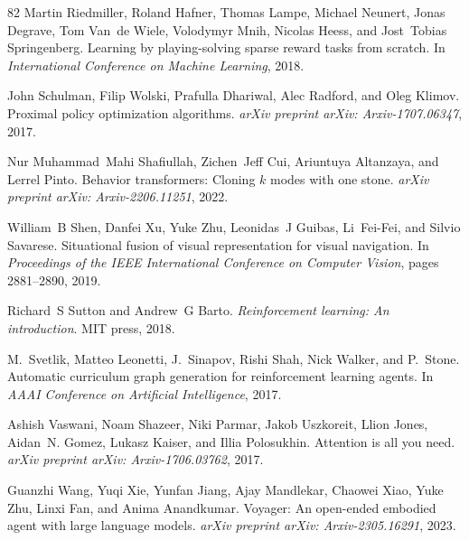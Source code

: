 \documentclass{article}
\begin{document}
\begin{thebibliography}{82}
Martin Riedmiller, Roland Hafner, Thomas Lampe, Michael Neunert, Jonas Degrave, Tom Van~de Wiele, Volodymyr Mnih, Nicolas Heess, and Jost~Tobias Springenberg.
\newblock Learning by playing-solving sparse reward tasks from scratch.
\newblock In \emph{International Conference on Machine Learning}, 2018.

John Schulman, Filip Wolski, Prafulla Dhariwal, Alec Radford, and Oleg Klimov.
\newblock Proximal policy optimization algorithms.
\newblock \emph{arXiv preprint arXiv: Arxiv-1707.06347}, 2017.

Nur Muhammad~Mahi Shafiullah, Zichen~Jeff Cui, Ariuntuya Altanzaya, and Lerrel Pinto.
\newblock Behavior transformers: Cloning $k$ modes with one stone.
\newblock \emph{arXiv preprint arXiv: Arxiv-2206.11251}, 2022.

William~B Shen, Danfei Xu, Yuke Zhu, Leonidas~J Guibas, Li~Fei-Fei, and Silvio Savarese.
\newblock Situational fusion of visual representation for visual navigation.
\newblock In \emph{Proceedings of the IEEE International Conference on Computer Vision}, pages 2881--2890, 2019.

Richard~S Sutton and Andrew~G Barto.
\newblock \emph{Reinforcement learning: An introduction}.
\newblock MIT press, 2018.

M.~Svetlik, Matteo Leonetti, J.~Sinapov, Rishi Shah, Nick Walker, and P.~Stone.
\newblock Automatic curriculum graph generation for reinforcement learning agents.
\newblock In \emph{AAAI Conference on Artificial Intelligence}, 2017.

Ashish Vaswani, Noam Shazeer, Niki Parmar, Jakob Uszkoreit, Llion Jones, Aidan~N. Gomez, Lukasz Kaiser, and Illia Polosukhin.
\newblock Attention is all you need.
\newblock \emph{arXiv preprint arXiv: Arxiv-1706.03762}, 2017.

Guanzhi Wang, Yuqi Xie, Yunfan Jiang, Ajay Mandlekar, Chaowei Xiao, Yuke Zhu, Linxi Fan, and Anima Anandkumar.
\newblock Voyager: An open-ended embodied agent with large language models.
\newblock \emph{arXiv preprint arXiv: Arxiv-2305.16291}, 2023{}.


\end{thebibliography}
\end{document}
